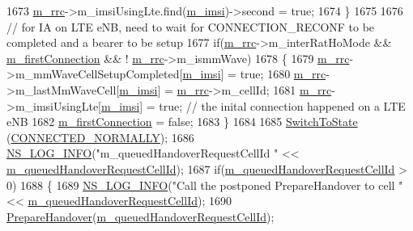 \begin{DoxyCode}
1673         \hyperlink{classns3_1_1UeManager_ab4405e9f354c66e7c1a4c95832290f5b}{m\_rrc}->m\_imsiUsingLte.find(\hyperlink{classns3_1_1UeManager_a868dda076ecfc1d4202e357c16223d84}{m\_imsi})->second = \textcolor{keyword}{true};
1674       \}
1675 
1676       \textcolor{comment}{// for IA on LTE eNB, need to wait for CONNECTION\_RECONF to be completed and a bearer to be setup}
1677       \textcolor{keywordflow}{if}(\hyperlink{classns3_1_1UeManager_ab4405e9f354c66e7c1a4c95832290f5b}{m\_rrc}->m\_interRatHoMode && \hyperlink{classns3_1_1UeManager_a80bbce0e682b9f64dd49292c0388d79d}{m\_firstConnection} && !
      \hyperlink{classns3_1_1UeManager_ab4405e9f354c66e7c1a4c95832290f5b}{m\_rrc}->m\_ismmWave)
1678       \{
1679         \hyperlink{classns3_1_1UeManager_ab4405e9f354c66e7c1a4c95832290f5b}{m\_rrc}->m\_mmWaveCellSetupCompleted[\hyperlink{classns3_1_1UeManager_a868dda076ecfc1d4202e357c16223d84}{m\_imsi}] = \textcolor{keyword}{true};
1680         \hyperlink{classns3_1_1UeManager_ab4405e9f354c66e7c1a4c95832290f5b}{m\_rrc}->m\_lastMmWaveCell[\hyperlink{classns3_1_1UeManager_a868dda076ecfc1d4202e357c16223d84}{m\_imsi}] = \hyperlink{classns3_1_1UeManager_ab4405e9f354c66e7c1a4c95832290f5b}{m\_rrc}->m\_cellId;
1681         \hyperlink{classns3_1_1UeManager_ab4405e9f354c66e7c1a4c95832290f5b}{m\_rrc}->m\_imsiUsingLte[\hyperlink{classns3_1_1UeManager_a868dda076ecfc1d4202e357c16223d84}{m\_imsi}] = \textcolor{keyword}{true}; \textcolor{comment}{// the inital connection happened on a LTE eNB}
1682         \hyperlink{classns3_1_1UeManager_a80bbce0e682b9f64dd49292c0388d79d}{m\_firstConnection} = \textcolor{keyword}{false};
1683       \}
1684 
1685       \hyperlink{classns3_1_1UeManager_af2b5ad90fc6f16ffc4a91fbe8a522472}{SwitchToState} (\hyperlink{classns3_1_1UeManager_a2f4085fdd18d7125c27da44a5b8b6808a2a1020dce30f19aa9354ba34b2e7c5e0}{CONNECTED\_NORMALLY});
1686       \hyperlink{group__logging_gafbd73ee2cf9f26b319f49086d8e860fb}{NS\_LOG\_INFO}(\textcolor{stringliteral}{"m\_queuedHandoverRequestCellId "} << 
      \hyperlink{classns3_1_1UeManager_a70f73047c76f4fd1be2cc3665c381704}{m\_queuedHandoverRequestCellId});
1687       \textcolor{keywordflow}{if}(\hyperlink{classns3_1_1UeManager_a70f73047c76f4fd1be2cc3665c381704}{m\_queuedHandoverRequestCellId} > 0)
1688       \{
1689         \hyperlink{group__logging_gafbd73ee2cf9f26b319f49086d8e860fb}{NS\_LOG\_INFO}(\textcolor{stringliteral}{"Call the postponed PrepareHandover to cell "} << 
      \hyperlink{classns3_1_1UeManager_a70f73047c76f4fd1be2cc3665c381704}{m\_queuedHandoverRequestCellId});
1690         \hyperlink{classns3_1_1UeManager_a1d842520ee54f281ee7eefc2a62f7844}{PrepareHandover}(\hyperlink{classns3_1_1UeManager_a70f73047c76f4fd1be2cc3665c381704}{m\_queuedHandoverRequestCellId});

\end{DoxyCode}
